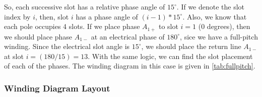 \documentclass[11pt]{report}
\begin{document}
So, each successive slot has a relative phase angle of $15^\circ$. If we denote the slot index by $i$, then, slot $i$ has a phase angle of $(i-1)*15^\circ$. Also, we know that each pole occupies 4 slots. If we place phase $A_{1+}$ to slot $i=1$ (0 degrees), then we should place phase $A_{1-}$ at an electrical phase of $180^\circ$, sice we have a full-pitch winding. Since the electrical slot angle is $15^\circ$, we should place the return line $A_{1-}$ at slot $i = (180/15)=13$. With the same logic, we can find the slot placement of each of the phases. The winding diagram in this case is given in \ref{tab:fullpitch}.


\begin{landscape}



\subsubsection*{Winding Diagram Layout}
\thispagestyle{empty}

\vspace*{\fill}

\begin{center}
\end{center}
\end{landscape}
\end{document}
